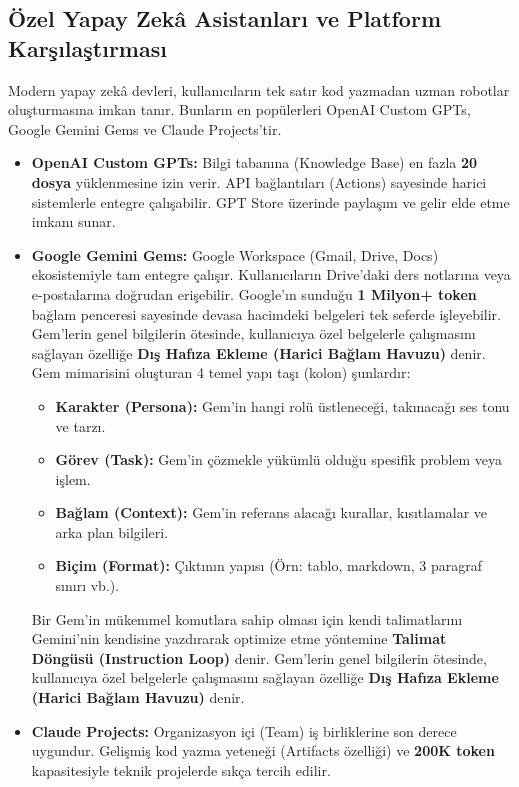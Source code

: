 \documentclass[11pt,a4paper,openany]{book}
\begin{document}
\subsection{Özel Yapay Zekâ Asistanları ve Platform Karşılaştırması}
Modern yapay zekâ devleri, kullanıcıların tek satır kod yazmadan uzman robotlar oluşturmasına imkan tanır. Bunların en popülerleri OpenAI Custom GPTs, Google Gemini Gems ve Claude Projects'tir.
\begin{itemize}
    \item \textbf{OpenAI Custom GPTs:} Bilgi tabanına (Knowledge Base) en fazla \textbf{20 dosya} yüklenmesine izin verir. API bağlantıları (Actions) sayesinde harici sistemlerle entegre çalışabilir. GPT Store üzerinde paylaşım ve gelir elde etme imkanı sunar.
    \item \textbf{Google Gemini Gems:} Google Workspace (Gmail, Drive, Docs) ekosistemiyle tam entegre çalışır. Kullanıcıların Drive'daki ders notlarına veya e-postalarına doğrudan erişebilir. Google'ın sunduğu \textbf{1 Milyon+ token} bağlam penceresi sayesinde devasa hacimdeki belgeleri tek seferde işleyebilir. Gem'lerin genel bilgilerin ötesinde, kullanıcıya özel belgelerle çalışmasını sağlayan özelliğe \textbf{Dış Hafıza Ekleme (Harici Bağlam Havuzu)} denir. Gem mimarisini oluşturan 4 temel yapı taşı (kolon) şunlardır:
        \begin{itemize}
            \item \textbf{Karakter (Persona):} Gem'in hangi rolü üstleneceği, takınacağı ses tonu ve tarzı.
            \item \textbf{Görev (Task):} Gem'in çözmekle yükümlü olduğu spesifik problem veya işlem.
            \item \textbf{Bağlam (Context):} Gem'in referans alacağı kurallar, kısıtlamalar ve arka plan bilgileri.
            \item \textbf{Biçim (Format):} Çıktının yapısı (Örn: tablo, markdown, 3 paragraf sınırı vb.).
        \end{itemize}
        Bir Gem'in mükemmel komutlara sahip olması için kendi talimatlarını Gemini'nin kendisine yazdırarak optimize etme yöntemine \textbf{Talimat Döngüsü (Instruction Loop)} denir. Gem'lerin genel bilgilerin ötesinde, kullanıcıya özel belgelerle çalışmasını sağlayan özelliğe \textbf{Dış Hafıza Ekleme (Harici Bağlam Havuzu)} denir.
    \item \textbf{Claude Projects:} Organizasyon içi (Team) iş birliklerine son derece uygundur. Gelişmiş kod yazma yeteneği (Artifacts özelliği) ve \textbf{200K token} kapasitesiyle teknik projelerde sıkça tercih edilir.
\end{itemize}
\end{document}
